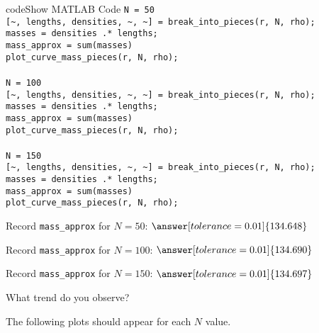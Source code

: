 \documentclass{ximera}
\begin{document}
\begin{expandable}{code}{Show MATLAB Code}
\texttt{N = 50}\\
\texttt{[\textasciitilde, lengths, densities, \textasciitilde, \textasciitilde] = break\_into\_pieces(r, N, rho);}\\
\texttt{masses = densities .* lengths;}\\
\texttt{mass\_approx = sum(masses)}\\
\texttt{plot\_curve\_mass\_pieces(r, N, rho);}\\
\\
\texttt{N = 100}\\
\texttt{[\textasciitilde, lengths, densities, \textasciitilde, \textasciitilde] = break\_into\_pieces(r, N, rho);}\\
\texttt{masses = densities .* lengths;}\\
\texttt{mass\_approx = sum(masses)}\\
\texttt{plot\_curve\_mass\_pieces(r, N, rho);}\\
\\
\texttt{N = 150}\\
\texttt{[\textasciitilde, lengths, densities, \textasciitilde, \textasciitilde] = break\_into\_pieces(r, N, rho);}\\
\texttt{masses = densities .* lengths;}\\
\texttt{mass\_approx = sum(masses)}\\
\texttt{plot\_curve\_mass\_pieces(r, N, rho);}
\end{expandable}

\begin{problem}
Record \texttt{mass\_approx} for $N=50$: $\answer[tolerance=0.01]{134.648}$

Record \texttt{mass\_approx} for $N=100$: $\answer[tolerance=0.01]{134.690}$

Record \texttt{mass\_approx} for $N=150$: $\answer[tolerance=0.01]{134.697}$

What trend do you observe? \begin{multipleChoice}
\end{multipleChoice}

\begin{feedback}
    The following plots should appear for each $N$ value.
\end{feedback}
\end{problem}
\end{document}
